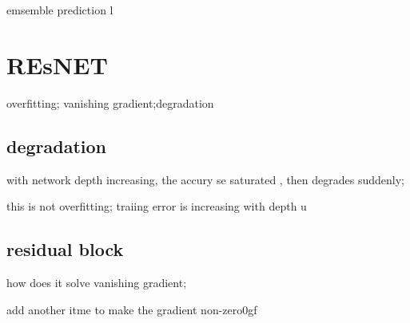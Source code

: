 \documentclass[12pt]{article}
\begin{document}
emsemble prediction
l

\section{REsNET}
overfitting; vanishing gradient;degradation

\subsection{degradation}
with network depth increasing, the accury se saturated  , then degrades suddenly;

this is not overfitting; traiing error is increasing with depth
u
\subsection{residual block}
how does it solve vanishing gradient;

add another itme to make the gradient non-zero0gf   
\end{document}
